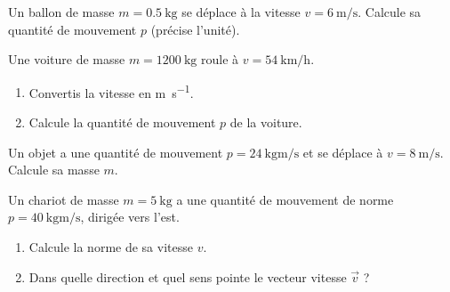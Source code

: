 \documentclass[11pt,a4paper]{article}
\newcommand{\vv}[1]{\vec{#1}}\newcommand{\ds}{\displaystyle}
\begin{document}

\begin{exo}
Un ballon de masse $m=\qty{0,5}{\kilogram}$ se déplace à la vitesse $v=\qty{6}{\metre\per\second}$.
Calcule sa quantité de mouvement $p$ (précise l'unité).
\end{exo}

\begin{exo}
Une voiture de masse $m=\qty{1200}{\kilogram}$ roule à $v=\qty{54}{\kilo\metre\per\hour}$.
\begin{enumerate}[label=\alph*)]
  \item Convertis la vitesse en \si{\metre\per\second}.
  \item Calcule la quantité de mouvement $p$ de la voiture.
\end{enumerate}
\end{exo}

\begin{exo}
Un objet a une quantité de mouvement $p=\qty{24}{\kilogram\metre\per\second}$ et se déplace à
$v=\qty{8}{\metre\per\second}$. Calcule sa masse $m$.
\end{exo}

\begin{exo}
Un chariot de masse $m=\qty{5}{\kilogram}$ a une quantité de mouvement de norme
$p=\qty{40}{\kilogram\metre\per\second}$, dirigée vers l'est.
\begin{enumerate}[label=\alph*)]
  \item Calcule la norme de sa vitesse $v$.
  \item Dans quelle direction et quel sens pointe le vecteur vitesse $\vv v$ ?
\end{enumerate}
\end{exo}
\end{document}
